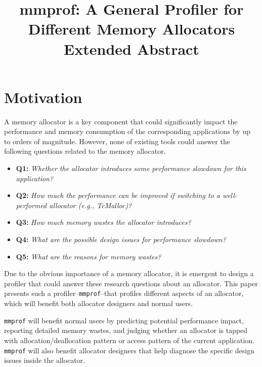\documentclass[pageno]{jpaper}
\newcommand{\MP}{\texttt{mmprof}}
\begin{document}
\title{mmprof: A General Profiler for Different Memory Allocators\\ \textbf{Extended Abstract}}

\date{}

\maketitle



\section{Motivation}
\label{sec:motivation}

A memory allocator is a key component that could significantly impact the performance and memory consumption of the corresponding applications by up to orders of magnitude. However, none of existing tools could answer the following questions related to the memory allocator. \\

\begin{itemize}
\item \textbf{Q1:} \textit{Whether the allocator introduces some performance slowdown for this application? }
\item \textbf{Q2:} \textit{How much the performance can be improved if switching to a well-performed allocator (e.g., TcMalloc)?}
\item \textbf{Q3:} \textit{How much memory wastes the allocator introduces?}
\item \textbf{Q4:} \textit{What are the possible design issues for performance slowdown?}
\item \textbf{Q5:} \textit{What are the reasons for memory wastes?} 
\end{itemize}
\vspace{0.1in}

Due to the obvious importance of a memory allocator, it is emergent to design a profiler that could answer these research questions about an allocator. This paper presents such a profiler--\MP{}--that profiles different aspects of an allocator, which will benefit both allocator designers and normal users. 

\MP{} will benefit normal users by predicting potential performance impact, reporting detailed memory wastes, and judging whether an allocator is tapped with allocation/deallocation pattern or access pattern of the current application. \MP{} will also benefit allocator designers that help diagnose the specific design issues inside the allocator. 
\end{document}
